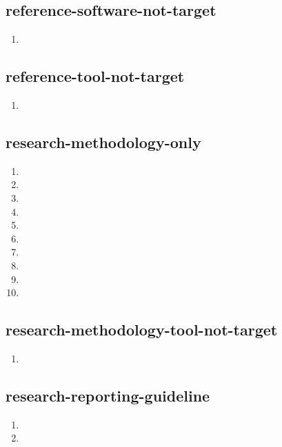 \documentclass{article}
\begin{document}
\subsection{reference-software-not-target}
\begin{enumerate}
\item {}
\end{enumerate}

\subsection{reference-tool-not-target}
\begin{enumerate}
\item {}
\end{enumerate}

\subsection{research-methodology-only}
\begin{enumerate}
\item {}
\item {}
\item {}
\item {}
\item {}
\item {}
\item {}
\item {}
\item {}
\item {}
\end{enumerate}

\subsection{research-methodology-tool-not-target}
\begin{enumerate}
\item {}
\end{enumerate}

\subsection{research-reporting-guideline}
\begin{enumerate}
\item {}
\item {}
\end{enumerate}
\end{document}
